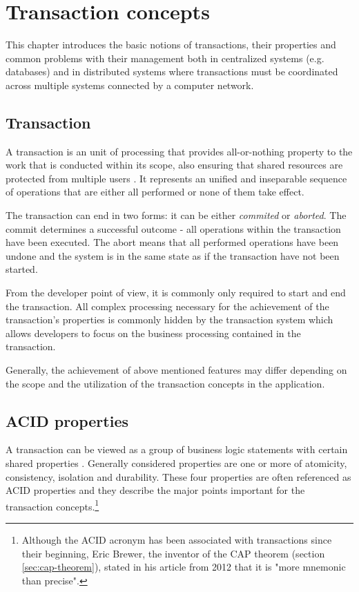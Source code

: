 \documentclass[oneside,
  digital, %
  table,   %
  lof,     %
  lot,     %
]{fithesis3}
\begin{document}
\clearpage
\chapter{Transaction concepts}

This chapter introduces the basic notions of transactions, their properties and common problems with their management both in centralized systems (e.g. databases) and in distributed systems where transactions must be coordinated across multiple systems connected by a computer network.

\section{Transaction}

A transaction is an unit of processing that provides all-or-nothing property to the work that is conducted within its scope, also ensuring that shared resources are protected from multiple users \cite{java_tran_processing}. It represents an unified and inseparable sequence of operations that are either all performed or none of them take effect. 

The transaction can end in two forms: it can be either \textit{commited} or \textit{aborted}. The commit determines a successful outcome - all operations within the transaction have been executed. The abort means that all performed operations have been undone and the system is in the same state as if the transaction have not been started.

From the developer point of view, it is commonly only required to start and end the transaction. All complex processing necessary for the achievement of the transaction's properties is commonly hidden by the transaction system \cite{java_tran_processing} which allows developers to focus on the business processing contained in the transaction.

Generally, the achievement of above mentioned features may differ depending on the scope and the utilization of the transaction concepts in the application.

\section{ACID properties}

A transaction can be viewed as a group of business logic statements with certain shared properties \cite{nar_wf}. Generally considered properties are one or more of atomicity, consistency, isolation and durability. These four properties are often referenced as ACID properties \cite{haerder_reuter_1983} and they describe the major points important for the transaction concepts.\footnote{Although the ACID acronym has been associated with transactions since their beginning, Eric Brewer, the inventor of the CAP theorem (section \ref{sec:cap-theorem}), stated in his article from 2012 that it is "more mnemonic than precise".\cite{cap_12years}}
\end{document}
